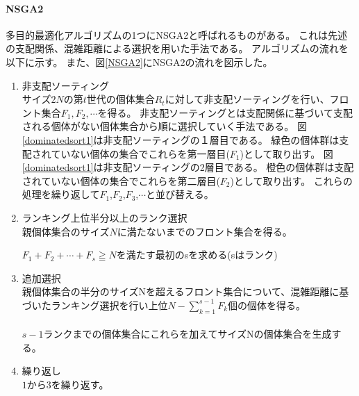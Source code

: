 \documentclass[10pt, a4paper, titlepage]{jarticle}
\begin{document}
\paragraph{NSGA2}
多目的最適化アルゴリズムの1つにNSGA2と呼ばれるものがある。
これは先述の支配関係、混雑距離による選択を用いた手法である。
アルゴリズムの流れを以下に示す。
また、図\ref{NSGA2}にNSGA2の流れを図示した。
\begin{enumerate}
\item 非支配ソーティング\\
サイズ$2N$の第$ t $世代の個体集合$R_t$に対して非支配ソーティングを行い、フロント集合$F_1,F_2,\cdots $を得る。
非支配ソーティングとは支配関係に基づいて支配される個体がない個体集合から順に選択していく手法である。
図\ref{dominatedsort1}は非支配ソーティングの１層目である。
緑色の個体群は支配されていない個体の集合でこれらを第一層目($F_1$)として取り出す。
図\ref{dominatedsort1}は非支配ソーティングの2層目である。
橙色の個体群は支配されていない個体の集合でこれらを第二層目($F_2$)として取り出す。
これらの処理を繰り返して$F_1$,$F_2$,$F_3$,$\cdots$と並び替える。
\item ランキング上位半分以上のランク選択\\
親個体集合のサイズ$ N $に満たないまでのフロント集合を得る。

$F_1+F_2+\cdots+ F_s \geqq{N} $を満たす最初のsを求める(sはランク)
\item 追加選択\\
親個体集合の半分のサイズNを超えるフロント集合について、混雑距離に基づいたランキング選択を行い上位$ N - \sum_{k=1}^{s-1}F_k $個の個体を得る。\\
\\ $s-1$ランクまでの個体集合にこれらを加えてサイズNの個体集合を生成する。
\item 繰り返し\\ 
$1$から$3$を繰り返す。
\end{enumerate}
\end{document}
